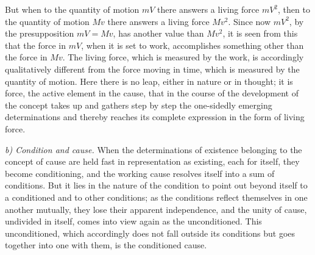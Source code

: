 \documentclass[12pt,a4paper]{book}
\newcommand{\runin}[1]{\emph{#1}\hspace{0.4em}}
\begin{document}
But when to the quantity of motion $mV$ there answers a living force $mV^{2}$, then to the
quantity of motion $Mv$ there answers a living force $Mv^{2}$. Since now $mV^{2}$, by the
presupposition $mV = Mv$, has another value than $Mv^{2}$, it is seen from this that the
force in $mV$, when it is set to work, accomplishes something other than the force in $Mv$.
The living force, which is measured by the work, is accordingly qualitatively different from
the force moving in time, which is measured by the quantity of motion. Here there is no leap,
either in nature or in thought; it is force, the active element in the cause, that in the
course of the development of the concept takes up and gathers step by step the one-sidedly
emerging determinations and thereby reaches its complete expression in the form of living
force.

\runin{b) Condition and cause.} When the determinations of existence belonging to the concept
of cause are held fast in representation as existing, each for itself, they become
conditioning, and the working cause resolves itself into a sum of conditions. But it lies in
the nature of the condition to point out beyond itself to a conditioned and to other
conditions; as the conditions reflect themselves in one another mutually, they lose their
apparent independence, and the unity of cause, undivided in itself, comes into view again as
the unconditioned. This unconditioned, which accordingly does not fall outside its conditions
but goes together into one with them, is the conditioned cause.
\end{document}

